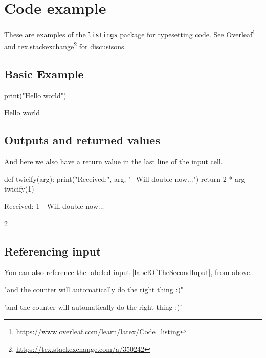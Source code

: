 
\section{Code example}

These are examples of the \texttt{listings} package for typesetting code. See Overleaf\footnote{\url{https://www.overleaf.com/learn/latex/Code_listing}} and tex.stackexchange\footnote{\url{https://tex.stackexchange.com/a/350242}} for discusisons.

\subsection{Basic Example}
\begin{pyin}
print("Hello world")
\end{pyin}

\begin{pyprint}
Hello world
\end{pyprint}

\subsection{Outputs and returned values}
And here we also have a return value in the last line of the input cell.
\begin{pyin}[labelOfTheSecondInput]
def twicify(arg):
    print("Received:", arg, "- Will double now...")
    return 2 * arg
twicify(1)
\end{pyin}

\begin{pyprint}
Received: 1 - Will double now...
\end{pyprint}

\begin{pyout}
2
\end{pyout}

\subsection{Referencing input}
You can also reference the labeled input \ref{labelOfTheSecondInput}, from above.
\begin{pyin}
"and the counter will automatically do the right thing :)"
\end{pyin}
\begin{pyout}
'and the counter will automatically do the right thing :)'
\end{pyout}

